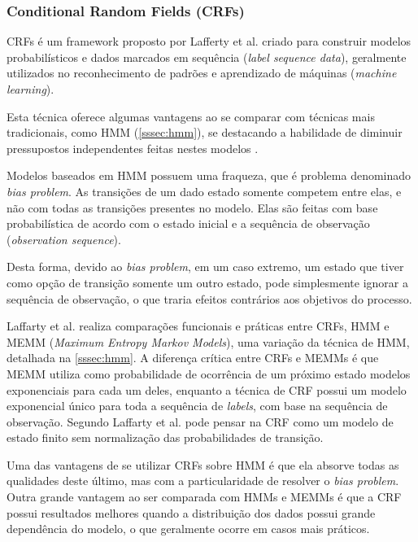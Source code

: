 \subsubsection{Conditional Random Fields (CRFs)}
\label{sssec:crf}


CRFs é um framework proposto por Lafferty et al. \cite{Lafferty-CRF} criado para construir modelos probabilísticos e dados marcados em sequência (\textit{label sequence data}), geralmente utilizados no reconhecimento de padrões e aprendizado de máquinas (\textit{machine learning}).

\begin{textnew}

Esta técnica oferece algumas vantagens ao se comparar com técnicas mais tradicionais, como HMM (\autoref{sssec:hmm}), se destacando a habilidade de diminuir pressupostos independentes feitas nestes modelos \cite{Lafferty-CRF}.

Modelos baseados em HMM possuem uma fraqueza, que é problema denominado \textit{bias problem}. As transições de um dado estado somente competem entre elas, e não com todas as transições presentes no modelo. Elas são feitas com base probabilística de acordo com o estado inicial e a sequência de observação (\textit{observation sequence}).

Desta forma, devido ao \textit{bias problem}, em um caso extremo, um estado que tiver como opção de transição somente um outro estado, pode simplesmente ignorar a sequência de observação, o que traria efeitos contrários aos objetivos do processo.

Laffarty et al. realiza comparações funcionais e práticas entre CRFs, HMM e MEMM (\textit{Maximum Entropy Markov Models}), uma variação da técnica de HMM, detalhada na \autoref{sssec:hmm}. A diferença crítica entre CRFs e MEMMs é que MEMM utiliza como probabilidade de ocorrência de um próximo estado modelos exponenciais para cada um deles, enquanto a técnica de CRF possui um modelo exponencial único para toda a sequência de \textit{labels}, com base na sequência de observação. Segundo Laffarty et al. \cite{Lafferty-CRF} pode pensar na CRF como um modelo de estado finito sem normalização das probabilidades de transição.

Uma das vantagens de se utilizar CRFs sobre HMM é que ela absorve todas as qualidades deste último, mas com a particularidade de resolver o \textit{bias problem}. Outra grande vantagem ao ser comparada com HMMs e MEMMs é que a CRF possui resultados melhores quando a distribuição dos dados possui grande dependência do modelo, o que geralmente ocorre em casos mais práticos.


\end{textnew}
